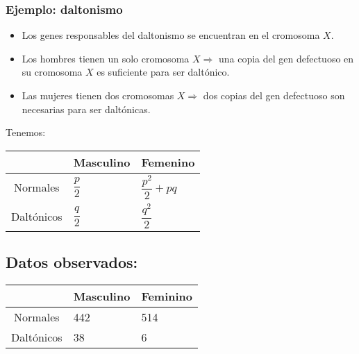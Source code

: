 \subsubsection*{Ejemplo: daltonismo}
\begin{tcolorbox}[colback=blue!5!white, colframe=blue!75!black, title=\textbf{La incidencia del daltonismo depende del sexo:}]
\begin{itemize}[label=\textbullet]
    \item Los genes responsables del daltonismo se encuentran en el cromosoma $X$.
    \item Los hombres tienen un solo cromosoma  $X\Longrightarrow $ una copia del gen defectuoso en su cromosoma $X$ es suficiente para ser daltónico.
    \item Las mujeres tienen dos cromosomas  $X\Longrightarrow $ dos copias del gen defectuoso son necesarias para ser daltónicas.
\end{itemize}
\end{tcolorbox}
\begin{tcolorbox}[colback=blue!5!white, colframe=blue!75!black, title=\textbf{Si llamamos $q$ a la probabilidad de que el cromosoma  $X$ tenga el gen defectuoso y  $p=1-q$.}]
Tenemos:
\begin{center}
    \begin{tabular}{cll}
      & \textbf{Masculino} & \textbf{Femenino}\\ \hline
        Normales & $\dfrac{p}{2}$ & $\dfrac{p^2}{2}+pq$\\ \hline
        Daltónicos & $\dfrac{q}{2}$ & $\dfrac{q^2}{2}$
 \end{tabular}   
\end{center}
\end{tcolorbox}
\subsection*{Datos observados:}
\begin{tcolorbox}[colback=blue!5!white, colframe=blue!75!black, title=\textbf{Para una muestra de 1000 personas:}]
\begin{center}
    \begin{tabular}{cll}
        & \textbf{Masculino} & \textbf{Feminino} \\ \hline
        Normales & 442 & 514\\
        Daltónicos & 38 & 6\\
    \end{tabular}
\end{center}
\end{tcolorbox}
\newpage

